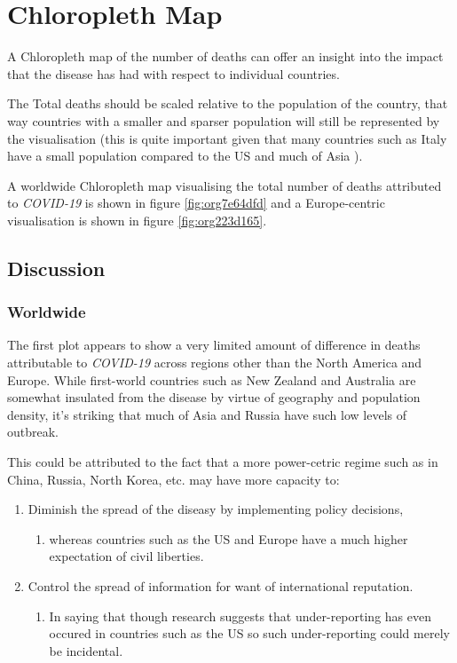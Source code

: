 \documentclass[11pt]{article}
\begin{document}
\section{Chloropleth Map}
\label{sec:org41a2a34}
A Chloropleth map of the number of deaths can offer an insight into the impact
that the disease has had with respect to individual countries.

The Total deaths should be scaled relative to the population of the country,
that way countries with a smaller and sparser population will still be
represented by the visualisation (this is quite important given that many
countries such as Italy have a small population compared to the US and much of
Asia \cite{2020n}).

A worldwide Chloropleth map visualising the total number of deaths attributed to
\emph{COVID-19} is shown in figure \ref{fig:org7e64dfd} and a Europe-centric visualisation is shown
in figure \ref{fig:org223d165}.

\subsection{Discussion}
\label{sec:org83a8edb}
\subsubsection{Worldwide}
\label{sec:org7accacb}
The first plot appears to show a very limited amount of difference in deaths
attributable to \emph{COVID-19} across regions other than the North America and
Europe. While first-world countries such as New Zealand and Australia are
somewhat insulated from the disease by virtue of geography and population
density, it's striking that much of Asia and Russia have such low levels of
outbreak.

This could be attributed to the fact that a more power-cetric regime such as in
China, Russia, North Korea, etc. may have more capacity to:

\begin{enumerate}
\item Diminish the spread of the diseasy by implementing
policy decisions,
\begin{enumerate}
\item whereas countries such as the US and Europe have a much higher expectation
of civil liberties.
\end{enumerate}
\item Control the spread of information for want of international reputation.
\begin{enumerate}
\item In saying that though research suggests that under-reporting has even
occured in countries such as the US \cite{sood2020} so such under-reporting
could merely be incidental.
\end{enumerate}
\end{enumerate}
\end{document}

